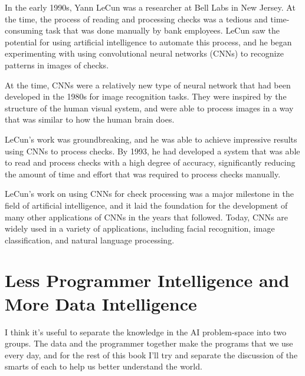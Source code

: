 In the early 1990s, Yann LeCun was a researcher at Bell Labs in New Jersey. At the time, the process of reading and processing checks was a tedious and time-consuming task that was done manually by bank employees. LeCun saw the potential for using artificial intelligence to automate this process, and he began experimenting with using convolutional neural networks (CNNs) to recognize patterns in images of checks.

At the time, CNNs were a relatively new type of neural network that had been developed in the 1980s for image recognition tasks. They were inspired by the structure of the human visual system, and were able to process images in a way that was similar to how the human brain does.

LeCun's work was groundbreaking, and he was able to achieve impressive results using CNNs to process checks. By 1993, he had developed a system that was able to read and process checks with a high degree of accuracy, significantly reducing the amount of time and effort that was required to process checks manually.

LeCun's work on using CNNs for check processing was a major milestone in the field of artificial intelligence, and it laid the foundation for the development of many other applications of CNNs in the years that followed. Today, CNNs are widely used in a variety of applications, including facial recognition, image classification, and natural language processing.

\section{Less Programmer Intelligence and More Data Intelligence}

I think it's useful to separate the knowledge in the AI problem-space into two groups. The data and the programmer together make the programs that we use every day, and for the rest of this book I'll try and separate the discussion of the smarts of each to help us better understand the world.

